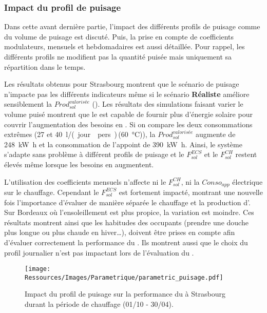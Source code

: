 \subsubsection{Impact du profil de puisage} %
\label{ssub:impact_du_profil_de_puisage}
Dans cette avant dernière partie, l’impact des différents profils de puisage comme du
volume de puisage est discuté. Puis, la prise en compte de coefficients modulateurs,
mensuels et hebdomadaires est aussi détaillée. Pour rappel, les différents profils ne
modifient pas la quantité puisée mais uniquement sa répartition dans le temps.

Les résultats obtenus pour Strasbourg montrent que le scénario de puisage n’impacte pas
les différents indicateurs même si le scénario \textbf{Réaliste} améliore sensiblement la
$Prod_{sol}^{valorisée}$ (). Les résultats des
simulations faisant varier le volume puisé montrent que le  est capable de
fournir plus d’énergie solaire pour couvrir l’augmentation des besoins
en . Si on compare les deux consommations extrêmes (\num{27} et
\SI{40}{\litre/(jour\period pers)}\,(\SI{60}{\celsius})), la $Prod_{sol}^{valorisée}$
augmente de \SI{248}{\kilo\watt\hour} et la consommation de l’appoint de \SI{390}{\kilo\watt\hour}.
Ainsi, le système s’adapte sans problème à différent profils de puisage et le
$F_{sol}^{ECS}$ et le $F_{sol}^{CH}$ restent élevés même lorsque les besoins en  augmentent.

L’utilisation des coefficients mensuels n’affecte ni le $F_{sol}^{CH}$, ni la $Conso_{app}$
électrique sur le chauffage. Cependant le $F_{sol}^{ECS}$ est fortement impacté, montrant une
nouvelle fois l’importance d’évaluer de manière séparée le chauffage et la production
d’. Sur Bordeaux où l’ensoleillement est plus propice, la variation est moindre. Ces
résultats montrent ainsi que les habitudes des occupants (prendre une douche plus longue
ou plus chaude en hiver\dots), doivent être prises en compte afin d’évaluer correctement la
performance du . Ils montrent aussi que le choix du profil journalier n’est pas impactant lors
de l’évaluation du .

\begin{figure}
    \centering
    \texttt{[image: Ressources/Images/Parametrique/parametric\_puisage.pdf]}
    \caption[Impact du profil de puisage sur la performance du ]
            {Impact du profil de puisage sur la performance
             du  à Strasbourg durant la période de chauffage (01/10 - 30/04).}
    \label{fig:impact_profil_puisage}
\end{figure}


